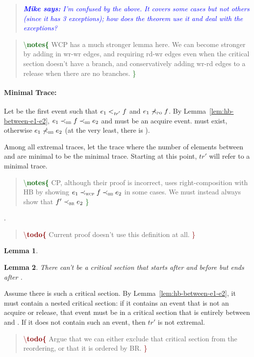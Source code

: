 \documentclass[letter,10pt]{article}
\newtheorem{lem}{Lemma}
\newcommand{\trPrime}{\ensuremath{\mathit{tr'}}\xspace}
\newcommand{\PO}{PO\xspace}
\newcommand{\HB}{HB\xspace}
\newcommand{\CP}{CP\xspace}
\newcommand{\WCP}{WCP\xspace}
\newcommand{\BR}{BR\xspace}
\newcommand{\ltTRPrime}{\ensuremath{<_\textsc{\trPrime}}\xspace}
\newcommand{\nltPO}{\ensuremath{\not\prec_\textsc{\tiny{\PO}}}\xspace}
\newcommand{\ltHB}{\ensuremath{\prec_\textsc{\tiny{\HB}}}\xspace}
\newcommand{\nltHB}{\ensuremath{\not\prec_\textsc{\tiny{\HB}}}\xspace}
\newcommand{\ltWCP}{\ensuremath{\prec_\textsc{\tiny{\WCP}}}\xspace}
\newcommand{\ltBR}{\ensuremath{\prec_\textsc{\tiny{\BR}}}\xspace}
\newcommand{\Ordered}[3]{\ensuremath{#1 #2 #3}}
\newcommand{\TRPrimeOrdered}[2]{\Ordered{#1}{\ltTRPrime}{#2}}
\newcommand{\nPOOrdered}[2]{\Ordered{#1}{\nltPO}{#2}}
\newcommand{\nHBOrdered}[2]{\Ordered{#1}{\nltHB}{#2}}
\newcommand{\HBOrdered}[2]{\Ordered{#1}{\ltHB}{#2}}
\newcommand{\WCPOrdered}[2]{\Ordered{#1}{\ltWCP}{#2}}
\newcommand{\BROrdered}[2]{\Ordered{#1}{\ltBR}{#2}}
\newcommand\notes[1]{\begin{quote}\textcolor{darkgreen}{\textbackslash \textbf{notes\{}} #1 \textcolor{darkgreen}{\}}\end{quote}}
\newcommand\todo[1]{\begin{quote}\textcolor{darkred}{\textbackslash \textbf{todo\{}} #1 \textcolor{darkred}{\}}\end{quote}}
\newcommand{\originalgrumbler}[2]{\begin{quote}\textcolor{blue}{\sl{\bf #1 says:} #2}\end{quote}}
\newcommand{\grumbler}[2]{\originalgrumbler{#1}{#2}}
\newcommand{\mike}[1]{\grumbler{Mike}{#1}}
\begin{document}
\mike{I'm confused by the above. It covers some cases but not others (since it has 3 exceptions); how does the theorem use it and deal with the exceptions?}

\notes{WCP has a much stronger lemma here. We can become stronger by adding in wr-wr
  edges, and requiring rd-wr edges even when the critical section doesn't have a
  branch, and conservatively adding wr-rd edges to a release when there
  are no branches.}

\paragraph{Minimal Trace:}
Let  be the first event such that
\TRPrimeOrdered{\event{e}{_1}}{\event{f}} and
\nPOOrdered{\event{e}{_1}}{\event{f}}. By Lemma~\ref{lem:hb-between-e1-e2},
\HBOrdered{\event{e}{_1}}{\HBOrdered{\event{f}}{\event{e}{_2}}} and 
must be an acquire event.  must exist, otherwise
\nHBOrdered{\event{e}{_1}}{\event{e}{_2}} (at the very least, there is ).

Among all extremal traces, let the trace where the number of elements between
 and  are minimal to be the minimal trace. Starting at
this point, \trPrime will refer to a minimal trace.

\notes{\CP, although their proof is incorrect, uses right-composition with \HB
  by showing \WCPOrdered{\event{e}{_1}}{\HBOrdered{\event{f}}{\event{e}{_2}}} in
  some cases. We must instead always show that
  \BROrdered{\event{f}{'}}{\event{e}{_2}}}.

\todo{Current proof doesn't use this definition at all.}

\begin{lem}
\end{lem}

\begin{lem}
  There can't be a critical section that starts after  and before
   but ends after .
\end{lem}

Assume there is such a critical section. By Lemma~\ref{lem:hb-between-e1-e2}, it
must contain a nested critical section: if it contains an event that is not an
acquire or release, that event must be in a critical section that is entirely
between  and . If it does not contain such an event,
then \trPrime is not extremal.

\todo{Argue that we can either exclude that critical section from the
  reordering, or that it is ordered by \BR.}
\end{document}
